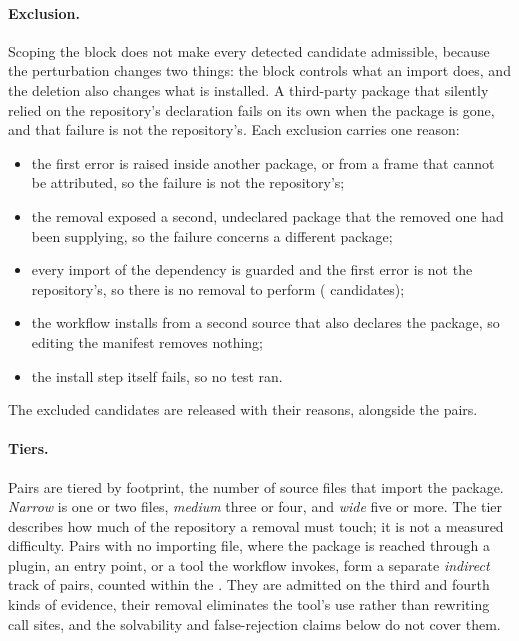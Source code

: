 \documentclass[11pt]{article}
\newif\ifdraft
\newcommand{\todo}[1]{\ifdraft\textcolor{red}{\textbf{[TODO: #1]}}\fi}
\begin{document}
\paragraph{Exclusion.}
Scoping the block does not make every detected candidate admissible, because the perturbation changes two things: the block controls what an import does, and the deletion also changes what is installed.
A third-party package that silently relied on the repository's declaration fails on its own when the package is gone, and that failure is not the repository's.
Each exclusion carries one reason:
\begin{itemize}\setlength{\itemsep}{0pt}
\item the first error is raised inside another package, or from a frame that cannot be attributed, so the failure is not the repository's;
\item the removal exposed a second, undeclared package that the removed one had been supplying, so the failure concerns a different package;
\item every import of the dependency is guarded and the first error is not the repository's, so there is no removal to perform (\todo{n} candidates); %
\item the workflow installs from a second source that also declares the package, so editing the manifest removes nothing;
\item the install step itself fails, so no test ran.
\end{itemize}
The excluded candidates are released with their reasons, alongside the pairs.

\paragraph{Tiers.}
Pairs are tiered by footprint, the number of source files that import the package.
\emph{Narrow} is one or two files, \emph{medium} three or four, and \emph{wide} five or more.
The tier describes how much of the repository a removal must touch; it is not a measured difficulty.
Pairs with no importing file, where the package is reached through a plugin, an entry point, or a tool the workflow invokes, form a separate \emph{indirect} track of \nTierIndirect{} pairs, counted within the \nPairs{}.
They are admitted on the third and fourth kinds of evidence, their removal eliminates the tool's use rather than rewriting call sites, and the solvability and false-rejection claims below do not cover them. %
\end{document}
